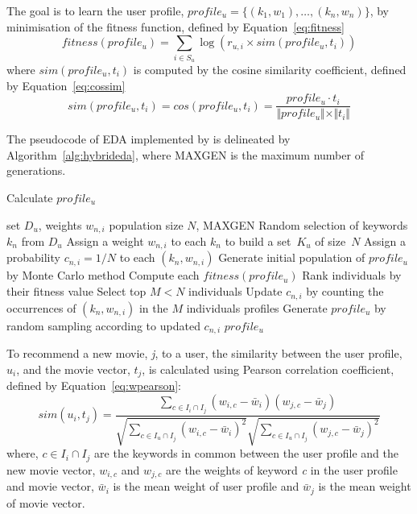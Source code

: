 The goal is to learn the user profile, $profile_u=\{(k_1,w_1),\ldots ,(k_n,w_n)\}$, by minimisation of the fitness function, defined by Equation~\eqref{eq:fitness}
\begin{equation}
fitness(profile_u) =\sum_{i\in S_u}\log(r_{u,i}\times sim(profile_u,t_i))
\label{eq:fitness}
\end{equation}
where $sim(profile_u,t_i)$ is computed by the cosine similarity coefficient, defined by Equation~\eqref{eq:cossim}
\begin{equation}
sim(profile_u, t_i)=cos(profile_u, t_i) =\frac{profile_u\cdot t_i}{\Vert profile_u\Vert\times\Vert t_i\Vert}
\label{eq:cossim}
\end{equation}

The pseudocode of EDA implemented by \textcite{Liang2014781} is delineated by Algorithm~\ref{alg:hybrideda}, where MAXGEN is the maximum number of generations.
\begin{algorithm}[ht!]
	\caption{Calculate $profile_u$}
	\begin{algorithmic} 
		\REQUIRE set $D_u$, weights $w_{n,i}$
		\REQUIRE population size $N$, MAXGEN
		\STATE Random selection of keywords $k_n$ from $D_u$
		\STATE Assign a weight $w_{n,i}$ to each $k_n$ to build a set~$K_u$ of size~$N$
		\STATE Assign a probability $c_{n,i}=1/N$ to each $(k_n,w_{n,i})$
		\STATE Generate initial population of $profile_u$ by Monte Carlo method
		\STATE Compute each $fitness(profile_u)$
		\STATE Rank individuals by their fitness value
		\STATE Select top $M < N$ individuals
		\STATE Update $c_{n,i}$ by counting the occurrences of $(k_n,w_{n,i})$ in the $M$ individuals profiles
		\STATE Generate $profile_u$ by random sampling according to updated $c_{n,i}$
		\ENDWHILE
		\RETURN $profile_u$
	\end{algorithmic}
	\label{alg:hybrideda}
\end{algorithm}

To recommend a new movie, \emph{j}, to a user, the similarity between the user profile, $u_i$, and the movie vector, $t_j$, is calculated using Pearson correlation coefficient, defined by Equation~\eqref{eq:wpearson}:
\begin{equation}
sim(u_i,t_j) =\frac{\sum _{c\in I_i \cap I_j}^{ } (w_{i,c} - \bar{w}_i)(w_{j,c} - \bar{w}_j)}{\sqrt{\sum _{c\in I_u \cap I_j}^{ }(w_{i,c} - \bar{w}_i)^2} \sqrt{\sum _{c\in I_u \cap I_j}^{ }(w_{j,c} - \bar{w}_j)^2}}
\label{eq:wpearson}
\end{equation}
where, $c\in I_i \cap I_j$ are the keywords in common between the user profile and the new movie vector, $w_{i,c}$ and $w_{j,c}$ are the weights of keyword \emph{c} in the user profile and movie vector, $\bar{w}_i$ is the mean weight of user profile and $\bar{w}_j$ is the mean weight of movie vector.

